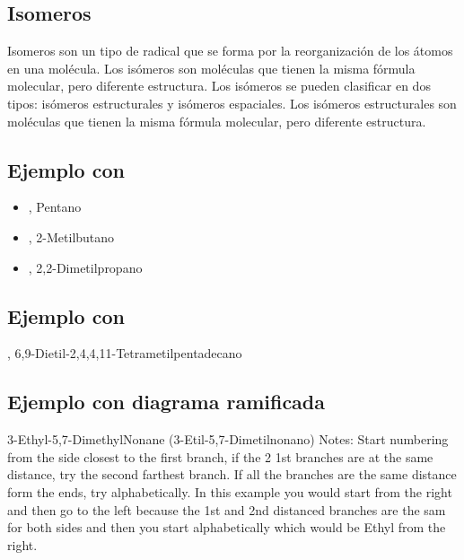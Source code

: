\begin{center}
\label{fig:2-Methylbutane}
\end{center}

\subsection{Isomeros}
Isomeros son un tipo de radical que se forma por la reorganización de los átomos en una molécula. Los isómeros son moléculas que tienen la misma fórmula molecular, pero diferente estructura. Los isómeros se pueden clasificar en dos tipos: isómeros estructurales y isómeros espaciales. Los isómeros estructurales son moléculas que tienen la misma fórmula molecular, pero diferente estructura.

\subsection*{Ejemplo con }

\begin{itemize}
    \item {}, Pentano
    \item {}, 2-Metilbutano
    \item {}, 2,2-Dimetilpropano
    \end{itemize}
    \qquad
    \subsection*{Ejemplo con }
    , 6,9-Dietil-2,4,4,11-Tetrametilpentadecano
    \qquad
\subsection*{Ejemplo con diagrama ramificada}
3-Ethyl-5,7-DimethylNonane (3-Etil-5,7-Dimetilnonano)
\quad
Notes: Start numbering from the side closest to the first branch, if the 2 1st branches are at the same distance, try the second farthest branch. If all the branches are the same distance form the ends, try alphabetically. In this example you would start from the right and then go to the left because the 1st and 2nd distanced branches are the sam for both sides and then you start alphabetically which would be Ethyl from the right.

